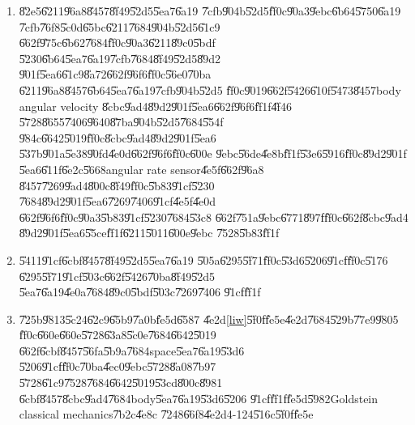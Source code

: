 \documentclass[12pt,a4paper]{article}
\begin{document}
\begin{enumerate}
\item \U{82e5}\U{6211}\U{96a8}\U{8457}\U{8f49}\U{52d5}\U{5ea7}\U{6a19}%
\U{7cfb}\U{904b}\U{52d5}\U{ff0c}\U{90a3}\U{9ebc}\U{6b64}\U{5750}\U{6a19}%
\U{7cfb}\U{76f8}\U{5c0d}\U{65bc}\U{6211}\U{7684}\U{904b}\U{52d5}\U{61c9}%
\U{662f}\U{975c}\U{6b62}\U{7684}\U{ff0c}\U{90a3}\U{6211}\U{89c0}\U{5bdf}%
\U{5230}\U{6b64}\U{5ea7}\U{6a19}\U{7cfb}\U{7684}\U{8f49}\U{52d5}\U{89d2}%
\U{901f}\U{5ea6}\U{61c9}\U{8a72}\U{662f}\U{96f6}\U{ff0c}\U{56e0}\U{70ba}%
\U{6211}\U{96a8}\U{8457}\U{6b64}\U{5ea7}\U{6a19}\U{7cfb}\U{904b}\U{52d5}%
\U{ff0c}\U{9019}\U{662f}\U{5426}\U{610f}\U{5473}\U{8457}body angular velocity%
\U{8cbc}\U{9ad4}\U{89d2}\U{901f}\U{5ea6}\U{662f}\U{96f6}\U{ff1f}\U{4f46}%
\U{5728}\U{8655}\U{7406}\U{9640}\U{87ba}\U{904b}\U{52d5}\U{7684}\U{554f}%
\U{984c}\U{6642}\U{5019}\U{ff0c}\U{8cbc}\U{9ad4}\U{89d2}\U{901f}\U{5ea6}%
\U{537b}\U{901a}\U{5e38}\U{90fd}\U{4e0d}\U{662f}\U{96f6}\U{ff0c}\U{600e}%
\U{9ebc}\U{56de}\U{4e8b}\U{ff1f}\U{53e6}\U{5916}\U{ff0c}\U{89d2}\U{901f}%
\U{5ea6}\U{611f}\U{6e2c}\U{5668}angular rate sensor\U{4e5f}\U{662f}\U{96a8}%
\U{8457}\U{7269}\U{9ad4}\U{800c}\U{8f49}\U{ff0c}\U{5b83}\U{91cf}\U{5230}%
\U{7684}\U{89d2}\U{901f}\U{5ea6}\U{7269}\U{7406}\U{91cf}\U{4e5f}\U{4e0d}%
\U{662f}\U{96f6}\U{ff0c}\U{90a3}\U{5b83}\U{91cf}\U{5230}\U{7684}\U{53c8}%
\U{662f}\U{751a}\U{9ebc}\U{6771}\U{897f}\U{ff0c}\U{662f}\U{8cbc}\U{9ad4}%
\U{89d2}\U{901f}\U{5ea6}\U{55ce}\U{ff1f}\U{6211}\U{5011}\U{600e}\U{9ebc}%
\U{7528}\U{5b83}\U{ff1f}

\item \U{5411}\U{91cf}\U{6cbf}\U{8457}\U{8f49}\U{52d5}\U{5ea7}\U{6a19}%
\U{505a}\U{6295}\U{5f71}\U{ff0c}\U{53d6}\U{5206}\U{91cf}\U{ff0c}\U{5176}%
\U{6295}\U{5f71}\U{91cf}\U{503c}\U{662f}\U{5426}\U{70ba}\U{8f49}\U{52d5}%
\U{5ea7}\U{6a19}\U{4e0a}\U{7684}\U{89c0}\U{5bdf}\U{503c}\U{7269}\U{7406}%
\U{91cf}\U{ff1f}

\item \U{725b}\U{9813}\U{5c24}\U{62c9}\U{65b9}\U{7a0b}\U{fe5d}\U{6587}%
\U{4e2d}\ref{liw}\U{5f0f}\U{fe5e}\U{4e2d}\U{7684}\U{529b}\U{77e9}\U{9805}%
\U{ff0c}\U{660e}\U{660e}\U{5728}\U{63a8}\U{5c0e}\U{7684}\U{6642}\U{5019}%
\U{662f}\U{6cbf}\U{8457}\U{56fa}\U{5b9a}\U{7684}space\U{5ea7}\U{6a19}\U{53d6}%
\U{5206}\U{91cf}\U{ff0c}\U{70ba}\U{4ec0}\U{9ebc}\U{5728}\U{8a08}\U{7b97}%
\U{5728}\U{61c9}\U{7528}\U{7684}\U{6642}\U{5019}\U{53cd}\U{800c}\U{8981}%
\U{6cbf}\U{8457}\U{8cbc}\U{9ad4}\U{7684}body\U{5ea7}\U{6a19}\U{53d6}\U{5206}%
\U{91cf}\U{ff1f}\U{fe5d}\U{5982}Goldstein classical mechanics\U{7b2c}\U{4e8c}%
\U{7248}\U{66f8}\U{4e2d}4-124\U{516c}\U{5f0f}\U{fe5e}


\end{enumerate}
\end{document}
